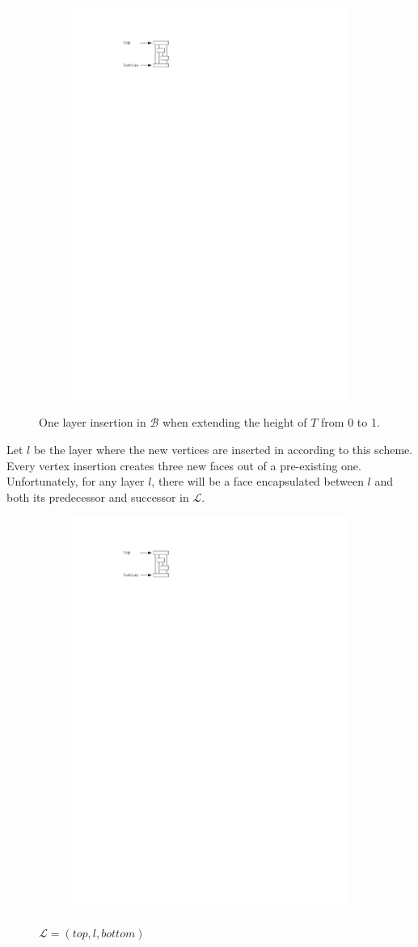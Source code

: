 \begin{figure}[H]
	\centering
	\begin{subfigure}{\textwidth}
		\centering
		\includegraphics[page=2,width=0.6\linewidth]{graphics/3-tree_example.pdf}
	\end{subfigure}
	\caption*{One layer insertion in $\mathcal{B}$ when extending the height of $T$ from 0 to 1.}
\end{figure}
Let $l$ be the layer where the new vertices are inserted in according to this scheme. Every vertex insertion creates three new faces out of a pre-existing one. Unfortunately, for any layer $l$, there will be a face encapsulated between $l$ and both its predecessor and successor in $\mathcal{L}$.
\begin{figure}[H]
	\centering
	\begin{subfigure}{\textwidth}
		\centering
		\includegraphics[page=3,width=0.6\linewidth]{graphics/3-tree_example.pdf}
	\end{subfigure}
	\caption*{$\mathcal{L} = (top, l, bottom)$}
\end{figure}

